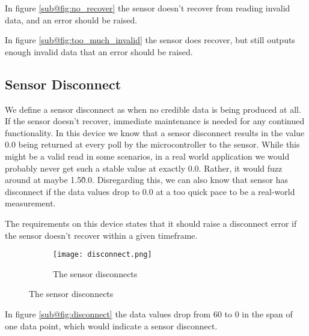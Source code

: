 In figure \ref{sub@fig:no_recover} the sensor doesn't recover from reading invalid data, and an error should be raised.

In figure \ref{sub@fig:too_much_invalid} the sensor does recover, but still outputs enough invalid data that an error should be raised. 


\subsection{Sensor Disconnect}
We define a sensor disconnect as when no credible data is being produced at all. If the sensor doesn't recover, immediate maintenance is needed for any continued functionality. In this device we know that a sensor disconnect results in the value 0.0 being returned at every poll by the microcontroller to the sensor. While this might be a valid read in some scenarios, in a real world application we would probably never get such a stable value at exactly 0.0. Rather, it would fuzz around at maybe 1.5\~0.0. Disregarding this, we can also know that sensor has disconnect if the data values drop to 0.0 at a too quick pace to be a real-world measurement. 

The requirements on this device states that it should raise a disconnect error if the sensor doesn't recover within a given timeframe.

\begin{figure}[H]
\centering
	\begin{subfigure}[b]{0.3\textwidth}
    \texttt{[image: disconnect.png]}
    \caption{The sensor disconnects}
    \label{fig:disconnect}
	\end{subfigure}
\end{figure}

In figure \ref{sub@fig:disconnect} the data values drop from 60 to 0 in the span of one data point, which would indicate a sensor disconnect.
